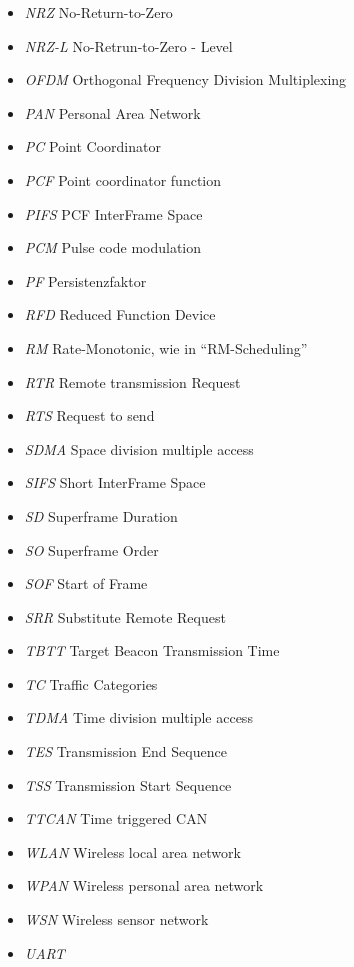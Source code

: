 \documentclass{article}
\begin{document}
\begin{itemize}
	\item \emph{NRZ} No-Return-to-Zero
	\item \emph{NRZ-L} No-Retrun-to-Zero - Level
	\item \emph{OFDM} Orthogonal Frequency Division Multiplexing
	\item \emph{PAN} Personal Area Network
	\item \emph{PC} Point Coordinator
	\item \emph{PCF} Point coordinator function
	\item \emph{PIFS} PCF InterFrame Space
	\item \emph{PCM} Pulse code modulation
	\item \emph{PF} Persistenzfaktor
	\item \emph{RFD} Reduced Function Device
	\item \emph{RM} Rate-Monotonic, wie in "`RM-Scheduling"'
	\item \emph{RTR} Remote transmission Request
	\item \emph{RTS} Request to send
	\item \emph{SDMA} Space division multiple access
	\item \emph{SIFS} Short InterFrame Space
	\item \emph{SD} Superframe Duration
	\item \emph{SO} Superframe Order
	\item \emph{SOF} Start of Frame
	\item \emph{SRR} Substitute Remote Request
	\item \emph{TBTT} Target Beacon Transmission Time
	\item \emph{TC} Traffic Categories
	\item \emph{TDMA} Time division multiple access
	\item \emph{TES} Transmission End Sequence
	\item \emph{TSS} Transmission Start Sequence
	\item \emph{TTCAN} Time triggered CAN
	\item \emph{WLAN} Wireless local area network
	\item \emph{WPAN} Wireless personal area network
	\item \emph{WSN} Wireless sensor network
	\item \emph{UART}
\end{itemize}
\end{document}
